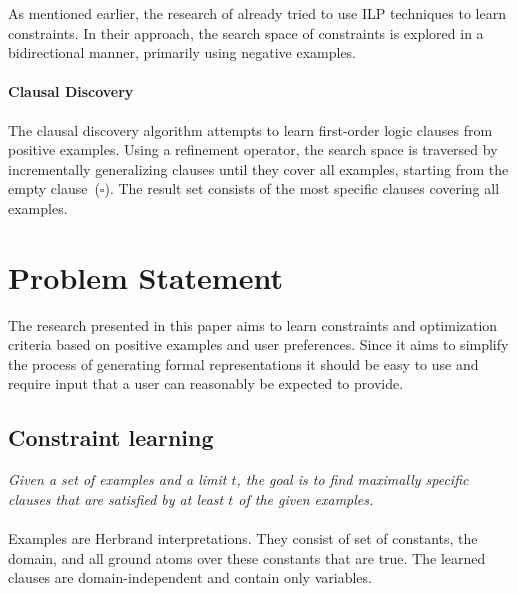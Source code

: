 \documentclass[letterpaper]{article}
\theoremstyle{definition}
\newtheorem{example}{Example}
\begin{document}
As mentioned earlier, the research of \cite{Lallouet:LearningCP} already tried to use ILP techniques to learn constraints.
In their approach, the search space of constraints is explored in a bidirectional manner, primarily using negative examples.

\paragraph{Clausal Discovery}
The clausal discovery algorithm \cite{DeRaedt:ClausalDiscovery} attempts to learn first-order logic clauses from positive examples.
Using a refinement operator, the search space is traversed by incrementally generalizing clauses until they cover all examples, starting from the empty clause~($\square$).
The result set consists of the most specific clauses covering all examples.


\section{Problem Statement}
The research presented in this paper aims to learn constraints and optimization criteria based on positive examples and user preferences.
Since it aims to simplify the process of generating formal representations it should be easy to use and require input that a user can reasonably be expected to provide.

\subsection{Constraint learning}
\emph{Given a set of examples and a limit $t$, the goal is to find maximally specific clauses that are satisfied by at least $t$ of the given examples.}
\\\\
Examples are Herbrand interpretations.
They consist of set of constants, the domain, and all ground atoms over these constants that are true.
The learned clauses are domain-independent and contain only variables.

\end{document}
